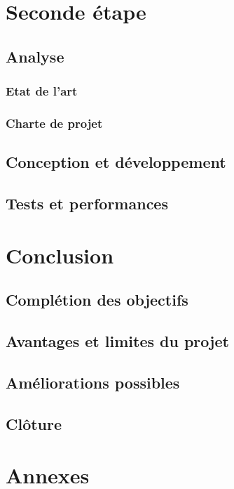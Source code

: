 \documentclass[a4paper, 12pt]{report}
\begin{document}
\chapter{Seconde étape}
\minitoc
{}
\clearpage
    \section{Analyse}
        \subsection{Etat de l'art}
        \subsection{Charte de projet}
    \section{Conception et développement}
    \section{Tests et performances}

\chapter{Conclusion}
\minitoc
{}
\clearpage
    \section{Complétion des objectifs}
    \section{Avantages et limites du projet}
    \section{Améliorations possibles}
    \section{Clôture}

\chapter{Annexes}
\minitoc
{}
\clearpage            

\appendix
\end{document}
